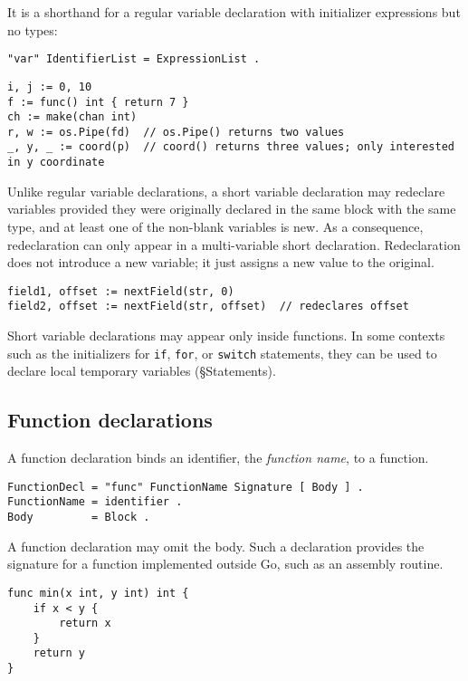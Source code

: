 {It is a shorthand for a regular
variable declaration with initializer
expressions but no types:

\begin{Verbatim}[frame=single]
"var" IdentifierList = ExpressionList .
\end{Verbatim}

\begin{Verbatim}[frame=single]
i, j := 0, 10
f := func() int { return 7 }
ch := make(chan int)
r, w := os.Pipe(fd)  // os.Pipe() returns two values
_, y, _ := coord(p)  // coord() returns three values; only interested in y coordinate
\end{Verbatim}

Unlike regular variable declarations, a short variable declaration may
redeclare variables provided they were originally declared in the same
block with the same type, and at least one of the
non-blank variables is new. As a
consequence, redeclaration can only appear in a multi-variable short
declaration. Redeclaration does not introduce a new variable; it just
assigns a new value to the original.

\begin{Verbatim}[frame=single]
field1, offset := nextField(str, 0)
field2, offset := nextField(str, offset)  // redeclares offset
\end{Verbatim}

Short variable declarations may appear only inside functions. In some
contexts such as the initializers for \texttt{if}, \texttt{for}, or
\texttt{switch} statements, they can be used to declare local temporary
variables (§Statements).

\subsection*{Function declarations}

A function declaration binds an identifier, the \emph{function name}, to
a function.

\begin{Verbatim}[frame=single]
FunctionDecl = "func" FunctionName Signature [ Body ] .
FunctionName = identifier .
Body         = Block .
\end{Verbatim}

A function declaration may omit the body. Such a declaration provides
the signature for a function implemented outside Go, such as an assembly
routine.

\begin{Verbatim}[frame=single]
func min(x int, y int) int {
    if x < y {
        return x
    }
    return y
}


\end{Verbatim}}
